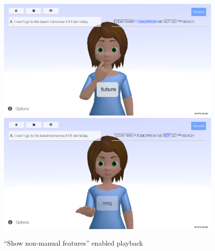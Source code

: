 \documentclass[12pt]{ociamthesis}  %
\begin{document}
{\begin{figure}[h]
	\centering
	\includegraphics[scale=0.4]{appendix/future}
    \includegraphics[scale=0.4]{appendix/neg}
    \caption{``Show non-manual features'' enabled playback}
    \label{fig:non-man-app}
\end{figure}	

}
\end{document}
